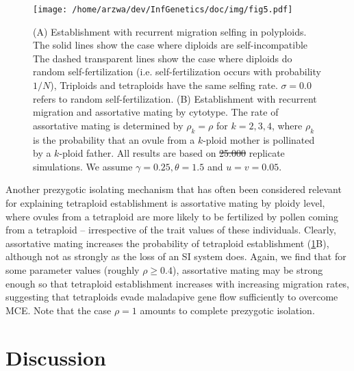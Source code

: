 \documentclass[12pt,a4paper]{article}
\providecommand{\DIFadd}[1]{{\protect\color{blue}\uwave{#1}}} %
\providecommand{\DIFdel}[1]{{\protect\color{red}\sout{#1}}}                      %
\providecommand{\DIFaddFL}[1]{\DIFadd{#1}} %
\providecommand{\DIFdelFL}[1]{\DIFdel{#1}} %
\providecommand{\DIFaddbeginFL}{} %
\providecommand{\DIFaddendFL}{} %
\providecommand{\DIFdelbeginFL}{} %
\providecommand{\DIFdelendFL}{} %
\begin{document}
\begin{figure}
\centering
\DIFdelbeginFL %
\DIFdelendFL \DIFaddbeginFL \texttt{[image: /home/arzwa/dev/InfGenetics/doc/img/fig5.pdf]} 
    \DIFaddendFL \caption{
    (A) Establishment with recurrent migration \DIFaddbeginFL \DIFaddFL{and }\DIFaddendFL selfing in polyploids. 
    The solid lines show the case where diploids are self-incompatible 
    The dashed transparent lines show the case where diploids do random
    self-fertilization (i.e. self-fertilization occurs with probability $1/N$),
    Triploids and tetraploids have the same selfing rate. 
    $\sigma=0.0$ refers to random self-fertilization.  
    (B) Establishment with recurrent migration and assortative mating by
    cytotype. The rate of assortative mating is determined by $\rho_k = \rho$
    for $k=2,3,4$, where $\rho_k$ is the probability that an ovule from a
    $k$-ploid mother is pollinated by a $k$-ploid father.
    All results are based on \DIFdelbeginFL \DIFdelFL{25.000 }\DIFdelendFL \DIFaddbeginFL \DIFaddFL{50.000 }\DIFaddendFL replicate simulations.  We assume
    \DIFdelbeginFL \DIFdelFL{$\gamma=0.25, \theta=1.5$ }\DIFdelendFL \DIFaddbeginFL \DIFaddFL{$\gamma=0.25, \theta=2$ }\DIFaddendFL and $u=v=0.05$.  \label{fig:selfing}}
\end{figure}

Another prezygotic isolating mechanism that has often been considered relevant
for explaining tetraploid establishment is assortative mating by ploidy level,
where ovules from a tetraploid are more likely to be fertilized by
pollen coming from a tetraploid -- irrespective of the trait values of these
individuals.
Clearly, assortative mating increases the probability of tetraploid
establishment (\cref{fig:selfing}B), although not as strongly as the loss of an SI
system does.
Again, we find that for some parameter values (roughly $\rho \ge 0.4$),
assortative mating may be strong enough so that tetraploid establishment
increases with increasing migration rates, suggesting that tetraploids evade
maladapive gene flow sufficiently to overcome MCE.
Note that the case $\rho = 1$ amounts to complete prezygotic isolation.

\section*{Discussion}
\end{document}

